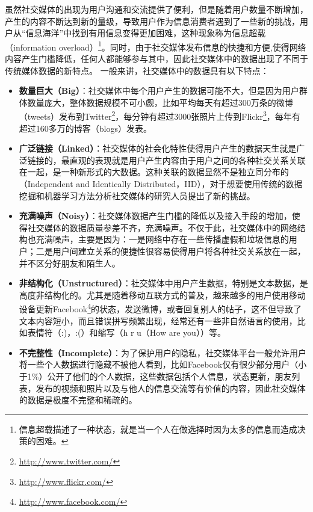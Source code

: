 虽然社交媒体的出现为用户沟通和交流提供了便利，但是随着用户数量不断增加，产生的内容不断达到新的量级，导致用户作为信息消费者遇到了一些新的挑战，用户从“信息海洋”中找到有用信息变得更加困难，这种现象称为信息超载（information overload）\footnote{信息超载描述了一种状态，就是当一个人在做选择时因为太多的信息而造成决策的困难。}。同时，由于社交媒体发布信息的快捷和方便,使得网络内容产生门槛降低，任何人都能够参与其中，因此社交媒体中的数据出现了不同于传统媒体数据的新特点。
一般来讲，社交媒体中的数据具有以下特点：
\begin{itemize}
\item \textbf{数量巨大（Big）}：社交媒体中每个用户产生的数据可能不大，但是因为用户群体数量庞大，整体数据规模不可小觑，比如平均每天有超过300万条的微博（tweets）发布到Twitter\footnote{\url{http://www.twitter.com/}}，每分钟有超过3000张照片上传到Flickr\footnote{\url{http://www.flickr.com/}}，每年有超过160多万的博客（blogs）发表。
\item \textbf{广泛链接（Linked）}：社交媒体的社会化特性使得用户产生的数据天生就是广泛链接的，最直观的表现就是用户产生内容由于用户之间的各种社交关系关联在一起，是一种新形式的大数据。这种关联的数据显然不是独立同分布的（Independent and Identically Distributed，IID），对于想要使用传统的数据挖掘和机器学习方法分析社交媒体的研究人员提出了新的挑战。
\item \textbf{充满噪声（Noisy）}：社交媒体数据产生门槛的降低以及接入手段的增加，使得社交媒体的数据质量参差不齐，充满噪声。不仅于此，社交媒体中的网络结构也充满噪声，主要是因为：一是网络中存在一些传播虚假和垃圾信息的用户；二是用户间建立关系的便捷性很容易使得用户将各种社交关系放在一起，并不区分好朋友和陌生人。
\item \textbf{非结构化（Unstructured）}：社交媒体中用户产生数据，特别是文本数据，是高度非结构化的。尤其是随着移动互联方式的普及，越来越多的用户使用移动设备更新Facebook\footnote{\url{http://www.facebook.com/}}的状态，发送微博，或者回复别人的帖子，这不但导致了文本内容短小，而且错误拼写频繁出现，经常还有一些非自然语言的使用，比如表情符（:)，:(）和缩写（h r u（How are you））等。
\item \textbf{不完整性（Incomplete）}：为了保护用户的隐私，社交媒体平台一般允许用户将一些个人数据进行隐藏不被他人看到，比如Facebook仅有很少部分用户（小于1\%）公开了他们的个人数据，这些数据包括个人信息，状态更新，朋友列表，发布的视频和照片以及与他人的信息交流等有价值的内容，因此社交媒体的数据是极度不完整和稀疏的。
\end{itemize}

